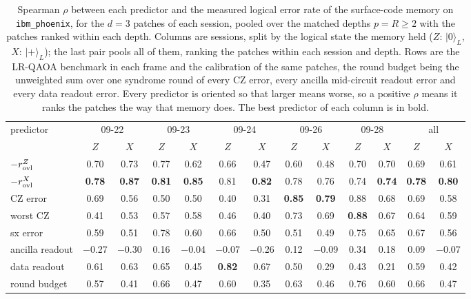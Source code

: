 \begin{table}[t]
\centering
\small
\caption{Spearman $\rho$ between each predictor and the measured logical error rate of the surface-code memory on \texttt{ibm_phoenix}, for the $d = 3$ patches of each session, pooled over the matched depths $p = R \ge 2$ with the patches ranked within each depth. Columns are sessions, split by the logical state the memory held ($Z$: $|0\rangle_L$, $X$: $|+\rangle_L$); the last pair pools all of them, ranking the patches within each session and depth. Rows are the LR-QAOA benchmark in each frame and the calibration of the same patches, the round budget being the unweighted sum over one syndrome round of every CZ error, every ancilla mid-circuit readout error and every data readout error. Every predictor is oriented so that larger means worse, so a positive $\rho$ means it ranks the patches the way that memory does. The best predictor of each column is in bold.}
\label{tab:predictors}
\begin{tabular}{lcccccccccc@{\quad}cc}
\toprule
predictor & \multicolumn{2}{c}{09-22} & \multicolumn{2}{c}{09-23} & \multicolumn{2}{c}{09-24} & \multicolumn{2}{c}{09-26} & \multicolumn{2}{c}{09-28} & \multicolumn{2}{c}{all} \\
 & $Z$ & $X$ & $Z$ & $X$ & $Z$ & $X$ & $Z$ & $X$ & $Z$ & $X$ & $Z$ & $X$ \\
\midrule
$-r_{\rm ovl}^{Z}$ & 0.70 & 0.73 & 0.77 & 0.62 & 0.66 & 0.47 & 0.60 & 0.48 & 0.70 & 0.70 & 0.69 & 0.61 \\
$-r_{\rm ovl}^{X}$ & \textbf{0.78} & \textbf{0.87} & \textbf{0.81} & \textbf{0.85} & 0.81 & \textbf{0.82} & 0.78 & 0.76 & 0.74 & \textbf{0.74} & \textbf{0.78} & \textbf{0.80} \\
CZ error & 0.69 & 0.56 & 0.50 & 0.50 & 0.40 & 0.31 & \textbf{0.85} & \textbf{0.79} & 0.88 & 0.68 & 0.69 & 0.58 \\
worst CZ & 0.41 & 0.53 & 0.57 & 0.58 & 0.46 & 0.40 & 0.73 & 0.69 & \textbf{0.88} & 0.67 & 0.64 & 0.59 \\
sx error & 0.59 & 0.51 & 0.78 & 0.60 & 0.66 & 0.50 & 0.51 & 0.49 & 0.75 & 0.65 & 0.67 & 0.56 \\
ancilla readout & $-$0.27 & $-$0.30 & 0.16 & $-$0.04 & $-$0.07 & $-$0.26 & 0.12 & $-$0.09 & 0.34 & 0.18 & 0.09 & $-$0.07 \\
data readout & 0.61 & 0.63 & 0.65 & 0.45 & \textbf{0.82} & 0.67 & 0.50 & 0.29 & 0.43 & 0.21 & 0.59 & 0.42 \\
round budget & 0.57 & 0.41 & 0.66 & 0.47 & 0.60 & 0.35 & 0.63 & 0.46 & 0.76 & 0.60 & 0.66 & 0.47 \\
\bottomrule
\end{tabular}
\end{table}

